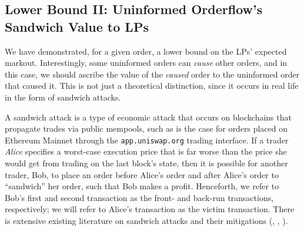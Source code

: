 

\subsection{Lower Bound II: Uninformed Orderflow's Sandwich Value to LPs} \label{subsection:sandwich-value-to-lps}
    We have demonstrated, for a given order, a lower bound on the LPs' expected markout. Interestingly, some uninformed orders can \textit{cause} other orders, and in this case, we should ascribe the value of the \textit{caused} order to the uninformed order that caused it. This is not just a theoretical distinction, since it occurs in real life in the form of sandwich attacks.

    A sandwich attack is a type of economic attack that occurs on blockchains that propagate trades via public mempools, such as is the case for orders placed on Ethereum Mainnet through the \texttt{app.uniswap.org} trading interface. If a trader \textit{Alice} specifies a worst-case execution price that is far worse than the price she would get from trading on the last block's state, then it is possible for another trader, Bob, to place an order before Alice's order and after Alice's order  to ``sandwich'' her order, such that Bob makes a profit. Henceforth, we refer to Bob's first and second transaction as the front- and back-run transactions, respectively; we will refer to Alice's transaction as the victim transaction. There is extensive existing literature on sandwich attacks and their mitigations (\cite{kulkarni2022towards}, \cite{zust2021analyzing}, \cite{zhou2021high}).
    
